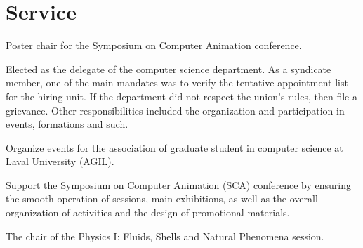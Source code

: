 \documentclass[10pt]{article} %
\begin{document}






\section{Service}
{
Poster chair for the Symposium on Computer Animation conference.\\
}

{
Elected as the delegate of the computer science department. As a syndicate member, one of the main mandates was to verify the tentative appointment list for the hiring unit. If the department did not respect the union's rules, then file a grievance. Other responsibilities included the organization and participation in events, formations and such.\\
}

{
Organize events for the association of graduate student in computer science at Laval University (AGIL).\\
}

{
Support the Symposium on Computer Animation (SCA) conference by ensuring the smooth operation of sessions, main exhibitions, as well as the overall organization of activities and the design of promotional materials.\\
}

{
The chair of the Physics I: Fluids, Shells and Natural Phenomena session.\\
}
\end{document}
